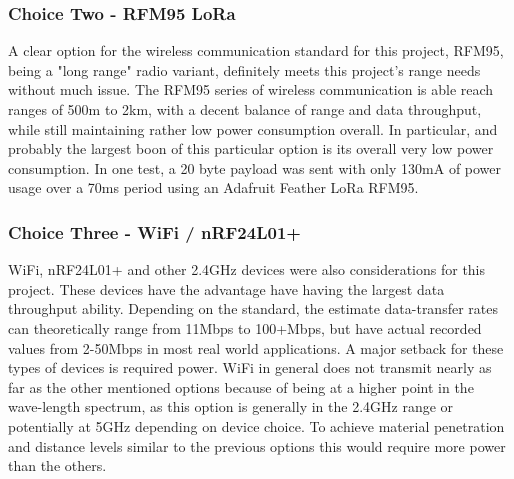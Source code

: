 \documentclass[onecolumn, draftclsnofoot,10pt, compsoc]{IEEEtran}
\begin{document}
    \subsubsection{Choice Two - RFM95 LoRa}
    A clear option for the wireless communication standard for this project, RFM95, being a "long range" radio variant, definitely meets this project's range needs without much issue.
    The RFM95 series of wireless communication is able reach ranges of 500m to 2km, with a decent balance of range and data throughput, while still maintaining rather low power consumption overall.
    In particular, and probably the largest boon of this particular option is its overall very low power consumption.
    In one test, a 20 byte payload was sent with only 130mA of power usage over a 70ms period using an Adafruit Feather LoRa RFM95.\cite{ladyada_pdf}    
    
    \subsubsection{Choice Three - WiFi / nRF24L01+}
    WiFi, nRF24L01+ and other 2.4GHz devices were also considerations for this project.
    These devices have the advantage have having the largest data throughput ability. 
    Depending on the standard, the estimate data-transfer rates can theoretically range from 11Mbps to 100+Mbps, but have actual recorded values from 2-50Mbps in most real world applications.\cite{speedguide}
    A major setback for these types of devices is required power.
    WiFi in general does not transmit nearly as far as the other mentioned options because of being at a higher point in the wave-length spectrum, as this option is generally in the 2.4GHz range or potentially at 5GHz depending on device choice.
    To achieve material penetration and distance levels similar to the previous options this would require more power than the others.
\end{document}

